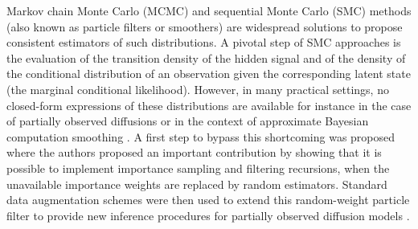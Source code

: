 \documentclass{article}
\begin{document}



Markov chain Monte Carlo (MCMC) and sequential Monte Carlo (SMC) methods (also known as particle filters or smoothers) are widespread solutions to propose consistent estimators of such distributions. A pivotal step of SMC approaches is the evaluation of the transition density of the hidden signal and of the density of the conditional distribution of an observation given the corresponding latent state (the marginal conditional likelihood). However, in many practical settings, no closed-form expressions of these distributions are available for instance in the case of partially observed diffusions \cite{andersson2017unbiased,fearnhead2017continuous} or in the context of  approximate Bayesian computation smoothing \cite{martin:jasra:singh:whiteley:delmoral:maccoy:2014}. A first step to bypass this shortcoming was proposed \cite{fearnhead2010random} where the authors proposed an important contribution by showing that it is possible to implement importance sampling and filtering recursions, when the unavailable importance weights are replaced by random estimators. Standard data augmentation schemes were then used to extend this random-weight particle filter to provide new inference procedures for partially observed diffusion models \cite{yonekura:beskos:2020}. 
\end{document}
